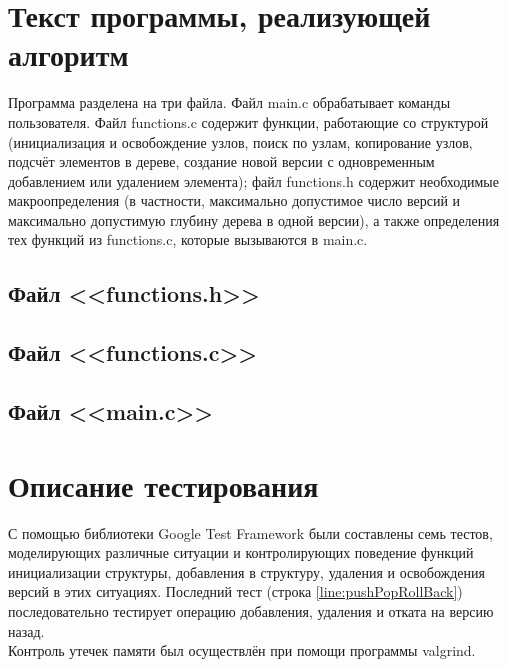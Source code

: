 \documentclass[zuev-23631-2-report.tex]{subfiles}
\begin{document}
\newpage
\section{Текст программы, реализующей алгоритм}

Программа разделена на три файла. Файл main.c обрабатывает команды пользователя. Файл functions.c содержит функции, работающие со структурой (инициализация и освобождение узлов, поиск по узлам, копирование узлов, подсчёт элементов в дереве, создание новой версии с одновременным добавлением или удалением элемента); файл functions.h содержит необходимые макроопределения (в частности, максимально допустимое число версий и максимально допустимую глубину дерева в одной версии), а также определения тех функций из functions.c, которые вызываются в main.c.

\subsection{Файл <<functions.h>>}


\subsection{Файл <<functions.c>>}
\label{functions}


\subsection{Файл <<main.c>>}
\label{main}


\newpage
\section{Описание тестирования}
С помощью библиотеки Google Test Framework были составлены семь тестов, моделирующих различные ситуации и контролирующих поведение функций инициализации структуры, добавления в структуру, удаления и освобождения версий в этих ситуациях. Последний тест (строка \ref{line:pushPopRollBack}) последовательно тестирует операцию добавления, удаления и отката на версию назад.\\
Контроль утечек памяти был осуществлён при помощи программы valgrind.\\
\end{document}
